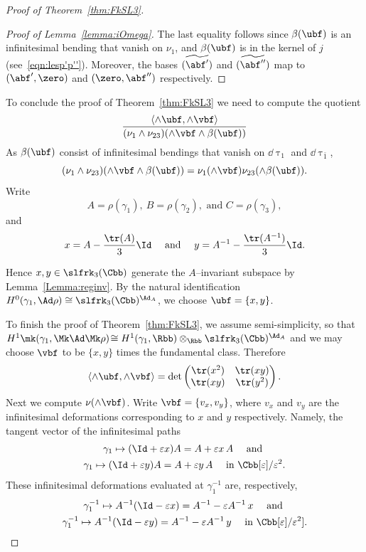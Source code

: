 \begin{proof}[Proof of Theorem~\ref{thm:FkSL3}]
\begin{proof}[Proof of Lemma~\ref{lemma:iOmega}]
The last equality follows since $\beta({\ubf})$ is an infinitesimal bending that vanish on $\nu_1$, and $\beta({\ubf})$ is in the kernel of $j$ (see~\eqref{eqn:lesp'p''}). Moreover, the bases $\widetilde{(\abf')}$ and $\widetilde{(\abf'')}$ map to $(\abf',\zero)$ and $(\zero,\abf'')$ respectively.
\end{proof}


To conclude the proof of Theorem~\ref{thm:FkSL3} we need to compute the quotient
\[
\frac{ \langle \wedge\ubf, \wedge\vbf \rangle }{ (\nu_1 \wedge \nu_{23}) (\wedge\vbf\wedge\beta(\ubf)) }
\]
As $\beta({\ubf})$ consist of infinitesimal bendings that vanish on $\dd\uptau_1$ and $\dd\uptau_{\bar 1}$,
\[
{ (\nu_1 \wedge \nu_{23}) (\wedge\vbf\wedge\beta(\ubf)) }={\nu_1(\wedge\vbf)\nu_{23}(\wedge\beta(\ubf)) }.
\]
Write
\[
A=\rho(\gamma_1), \ B=\rho(\gamma_2), \text{ and } C=\rho(\gamma_3),
\]
and
\[
x=A-\frac{\tr(A) }{3}\Id\quad \text{ and }\quad y=A^{-1}-\frac{\tr(A^{-1}) }{3}\Id.
\]

Hence $x,y \in
\slfrk_3(\Cbb) $ generate the $A$--invariant subspace by Lemma~\ref{Lemma:reginv}. By the natural identification $H^0(\gamma_1,\Ad\rho)\cong
\slfrk_3(\Cbb)^{\Ad_A}$, we choose $\ubf=\{x,y\}$.



To finish the proof of Theorem~\ref{thm:FkSL3}, we assume semi-simplicity, so that $H^1\mk(\gamma_1,\Mk\Ad\Mk\rho)\!\cong H^1(\gamma_1,\Rbb)\otimes_\Rbb
\slfrk_3(\Cbb)^{\Ad_A}$ and we may choose $\vbf$ to be $\{x,y\}$ times the fundamental class. Therefore
\begin{equation}\label{eqn:wedgeuv}
\langle \wedge\ubf, \wedge\vbf \rangle=\det
\begin{pmatrix}
\tr(x^2) & \tr(x y) \\
\tr(x y) & \tr(y^2)
\end{pmatrix}.
\end{equation}
Next we compute $\nu(\wedge\vbf)$. Write $\vbf=\{v_x,v_y\}$, where $v_x$ and $v_y$ are the infinitesimal deformations corresponding to $x$ and $y$ respectively. Namely, the tangent vector of the infinitesimal paths
\begin{multline}\label{eqn:infvxvyg1}
\gamma_1\mapsto (\Id+\varepsilon x)A= A+\varepsilon x\,A \quad \text{ and }\\ \gamma_1\mapsto (\Id+\varepsilon y)A= A+\varepsilon y\, A \quad \text{ in }\Cbb[\varepsilon]/\varepsilon^2.
\end{multline}
These infinitesimal deformations evaluated at $\gamma_1^{-1}$ are, respectively,
\begin{multline}\label{eqn:infvxvyg1bar}
\gamma_1^{-1}\mapsto A^{-1}(\Id-\varepsilon x)= A^{-1}-\varepsilon A^{-1}\, x\quad \text{ and }\\
\gamma_1^{-1}\mapsto A^{-1}(\Id-\varepsilon y)= A^{-1}-\varepsilon A^{-1}\,y \quad
\text{ in }\Cbb[\varepsilon]/\varepsilon^2].
\end{multline}


\end{proof}
